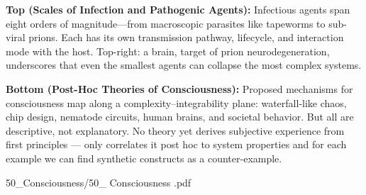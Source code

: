\begin{SideNotePage}{
  \textbf{Top (Scales of Infection and Pathogenic Agents):}  
  Infectious agents span eight orders of magnitude—from macroscopic parasites like tapeworms to sub-viral prions. Each has its own transmission pathway, lifecycle, and interaction mode with the host. Top-right: a brain, target of prion neurodegeneration, underscores that even the smallest agents can collapse the most complex systems. \par

  \textbf{Bottom (Post-Hoc Theories of Consciousness):}  
  Proposed mechanisms for consciousness map along a complexity–integrability plane: waterfall-like chaos, chip design, nematode circuits, human brains, and societal behavior. But all are descriptive, not explanatory. No theory yet derives subjective experience from first principles — only correlates it post hoc to system properties and for each example we can find synthetic constructs as a counter-example. \par
}{50_Consciousness/50_ Consciousness .pdf}
\end{SideNotePage}

